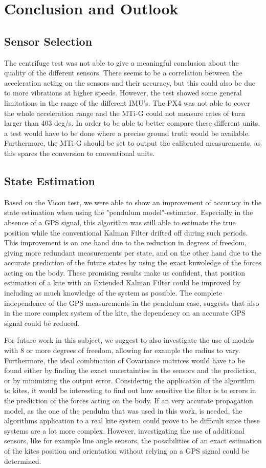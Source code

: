\chapter{Conclusion and Outlook}\label{cha}
\section{Sensor Selection}
The centrifuge test was not able to give a meaningful conclusion about the quality of the different sensors. There seems to be a correlation between the acceleration acting on the sensors and their accuracy, but this could also be due to more vibrations at higher speeds. However, the test showed some general limitations in the range of the different IMU's. The PX4 was not able to cover the whole acceleration range and the MTi-G could not measure rates of turn larger than 403 deg/s. In order to be able to better compare these different units, a test would have to be done where a precise ground truth would be available. Furthermore, the MTi-G should be set to output the calibrated measurements, as this spares the conversion to conventional units.

\section{State Estimation}
Based on the Vicon test, we were able to show an improvement of accuracy in the state estimation when using the "pendulum model"-estimator. Especially in the absence of a GPS signal, this algorithm was still able to estimate the true position while the conventional Kalman Filter drifted off during such periods. This improvement is on one hand due to the reduction in degrees of freedom, giving more redundant measurements per state, and on the other hand due to the accurate prediction of the future states by using the exact knwoledge of the forces acting on the body. These promising results make us confident, that position estimation of a kite with an Extended Kalman Filter could be improved by including as much knowledge of the system as possible. The complete independence of the GPS measurements in the pendulum case, suggests that also in the more complex system of the kite, the dependency on an accurate GPS signal could be reduced.

For future work in this subject, we suggest to also investigate the use of models with 8 or more degrees of freedom, allowing for example the radius to vary. Furthermore, the ideal combination of Covariance matrices would have to be found either by finding the exact uncertainties in the sensors and the prediction, or by minimizing the output error. Considering the application of the algorithm to kites, it would be interesting to find out how sensitive the filter is to errors in the prediction of the forces acting on the body. If an very accurate propagation model, as the one of the pendulm that was used in this work, is needed, the algorithms application to a real kite system could prove to be difficult since these systems are a lot more complex. However, investigating the use of additional sensors, like for example line angle sensors, the possibilities of an exact estimation of the kites position and orientation without relying on a GPS signal could be determined. 
